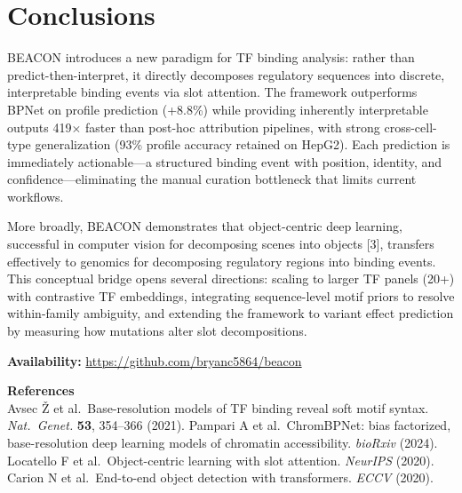 \documentclass[10pt]{article}
\begin{document}
\section*{Conclusions}

BEACON introduces a new paradigm for TF binding analysis: rather than predict-then-interpret, it directly decomposes regulatory sequences into discrete, interpretable binding events via slot attention. The framework outperforms BPNet on profile prediction (+8.8\%) while providing inherently interpretable outputs 419$\times$ faster than post-hoc attribution pipelines, with strong cross-cell-type generalization (93\% profile accuracy retained on HepG2). Each prediction is immediately actionable---a structured binding event with position, identity, and confidence---eliminating the manual curation bottleneck that limits current workflows.

More broadly, BEACON demonstrates that object-centric deep learning, successful in computer vision for decomposing scenes into objects [3], transfers effectively to genomics for decomposing regulatory regions into binding events. This conceptual bridge opens several directions: scaling to larger TF panels (20+) with contrastive TF embeddings, integrating sequence-level motif priors to resolve within-family ambiguity, and extending the framework to variant effect prediction by measuring how mutations alter slot decompositions.

\vspace{3pt}
\noindent\textbf{Availability:} \url{https://github.com/bryanc5864/beacon}

\vspace{4pt}
\noindent\textbf{\small References}\\
{\footnotesize
\noindent [1] Avsec \v{Z} et al.\ Base-resolution models of TF binding reveal soft motif syntax. \textit{Nat.\ Genet.} \textbf{53}, 354--366 (2021).
\enspace [2] Pampari A et al.\ ChromBPNet: bias factorized, base-resolution deep learning models of chromatin accessibility. \textit{bioRxiv} (2024).\\
\noindent [3] Locatello F et al.\ Object-centric learning with slot attention. \textit{NeurIPS} (2020).
\enspace [4] Carion N et al.\ End-to-end object detection with transformers. \textit{ECCV} (2020).
}
\end{document}
